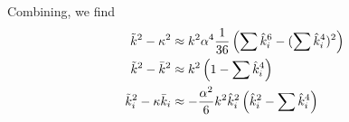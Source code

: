 \documentclass{revtex4}
\begin{document}
Combining, we find
\begin{subequations}
  \begin{align}
    \tilde{k}^2-\kappa^2 &\approx k^2\alpha^4\frac{1}{36}\left(\sum\hat{k}_i^6 - (\sum\hat{k}_i^4)^2 \right)\\
    \tilde{k}^2-\bar{k}^2 &\approx k^2\left(1-\sum\hat{k}_i^4\right) \\
    \tilde{k}_i^2-\kappa\bar{k}_i &\approx -\frac{\alpha^2}{6}k^2\hat{k}_i^2\left(\hat{k}_i^2-\sum\hat{k}_i^4\right)
  \end{align}
\end{subequations}
\end{document}
